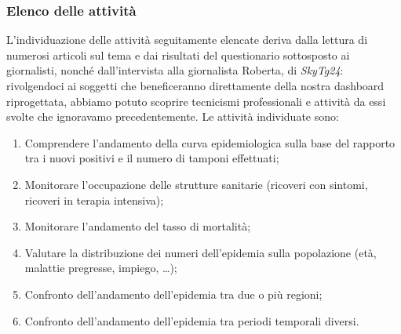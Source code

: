 \subsubsection{Elenco delle attività}
L'individuazione delle attività seguitamente elencate deriva dalla lettura di numerosi articoli sul tema e dai risultati del questionario sottosposto ai giornalisti, nonché dall'intervista alla giornalista Roberta, di \textit{SkyTg24}: rivolgendoci ai soggetti che beneficeranno direttamente della nostra dashboard riprogettata, abbiamo potuto scoprire tecnicismi professionali e attività da essi svolte che ignoravamo precedentemente.
\noindent
Le attività individuate sono:
\begin{enumerate}
    \item Comprendere l'andamento della curva epidemiologica sulla base del rapporto tra i nuovi positivi e il numero di tamponi effettuati;\label{itm:1}
    \item Monitorare l'occupazione delle strutture sanitarie (ricoveri con sintomi, ricoveri in terapia intensiva);\label{itm:2}
    \item Monitorare l'andamento del tasso di mortalità;\label{itm:3}
    \item Valutare la distribuzione dei numeri dell'epidemia sulla popolazione (età, malattie pregresse, impiego, …);\label{itm:4}
    \item Confronto dell'andamento dell'epidemia tra due o più regioni;\label{itm:5}
    \item Confronto dell'andamento dell'epidemia tra periodi temporali diversi.\label{itm:6}
\end{enumerate}

